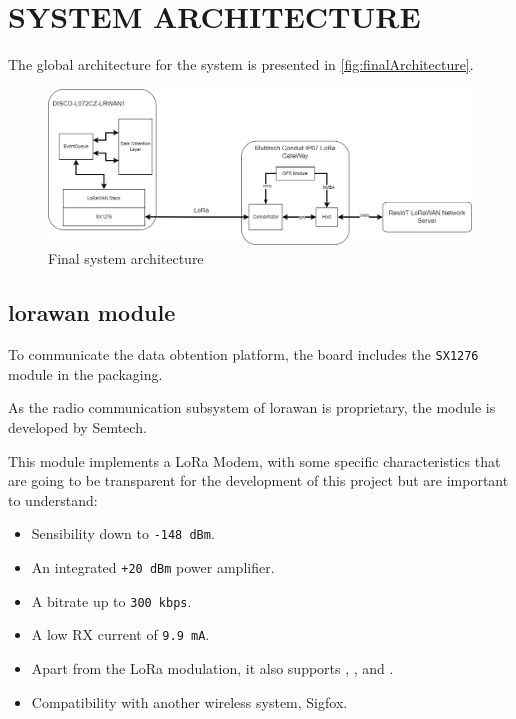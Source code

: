 \section{SYSTEM ARCHITECTURE}
The global architecture for the system is presented in \autoref{fig:finalArchitecture}.

\begin{figure}[H]
    \centering
    \includegraphics[width=1\textwidth]{images/3/Modules.drawio.png}
    \caption{Final system architecture}
    \label{fig:finalArchitecture}
\end{figure}

\subsection{\acrshort{lorawan} module}

To communicate the data obtention platform, the board\cite{DISCOL072CZLRWAN1Mbeda} includes the \texttt{SX1276}\cite{SX1276}  module in the packaging.

As the radio communication subsystem of \acrshort{lorawan} is proprietary, the module is developed by Semtech.

This module implements a LoRa Modem, with some specific characteristics that are going to be transparent for the development of this project but are important to understand:
\begin{itemize}
    \item Sensibility down to \texttt{-148 dBm}.
    \item An integrated \texttt{+20 dBm} power amplifier.
    \item A bitrate up to \texttt{300 kbps}.
    \item A low RX current of \texttt{9.9 mA}.
    \item Apart from the LoRa modulation, it also supports , ,  and .
    \item Compatibility with another wireless system, Sigfox.
\end{itemize}

